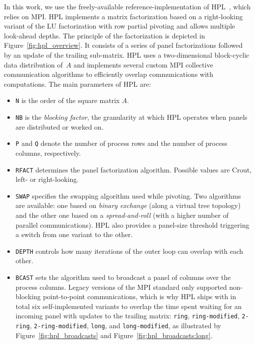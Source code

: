         In this work, we use the freely-available reference-implementation of HPL~\cite{hpl}, which relies on MPI.  HPL
        implements a matrix factorization based on a right-looking variant of the LU factorization with row partial pivoting
        and allows multiple look-ahead depths. The principle of the factorization is depicted in
        Figure~\ref{fig:hpl_overview}. It consists of a series of panel factorizations followed by an update of the trailing
        sub-matrix.  HPL uses a two-dimensional block-cyclic data distribution of $A$ and implements several custom MPI
        collective communication algorithms to efficiently overlap communications with computations.
        The main parameters of HPL are:
        \begin{itemize}
            \item \texttt{N} is the order of the square matrix $A$.
            \item \texttt{NB} is the \emph{blocking factor}, \ie the granularity at which HPL operates when panels are
                distributed or worked on.
            \item \texttt{P} and \texttt{Q} denote the number of process rows and the number of process columns,
                respectively.
            \item \texttt{RFACT} determines the panel factorization algorithm. Possible values are Crout, left- or
                right-looking.
            \item \texttt{SWAP} specifies the swapping algorithm used while pivoting. Two algorithms are available: one
                based on \emph{binary exchange} (along a virtual tree topology) and the other one based on a
                \emph{spread-and-roll} (with a higher number of parallel communications). HPL also provides a panel-size
                threshold triggering a switch from one variant to the other.
            \item \texttt{DEPTH} controls how many iterations of the outer loop can overlap with each other.
            \item \texttt{BCAST} sets the algorithm used to broadcast a panel of columns over the process columns. Legacy
                versions of the MPI standard only supported non-blocking point-to-point communications, which is why HPL
                ships with in total six self-implemented variants to overlap the time spent waiting for an incoming
                panel with updates to the trailing matrix: \texttt{ring}, \texttt{ring-modified}, \texttt{2-ring},
                \texttt{2-ring-modified}, \texttt{long}, and \texttt{long-modified}, as illustrated by
                Figure~\ref{fig:hpl_broadcasts} and Figure~\ref{fig:hpl_broadcasts:long}.


\end{itemize}

